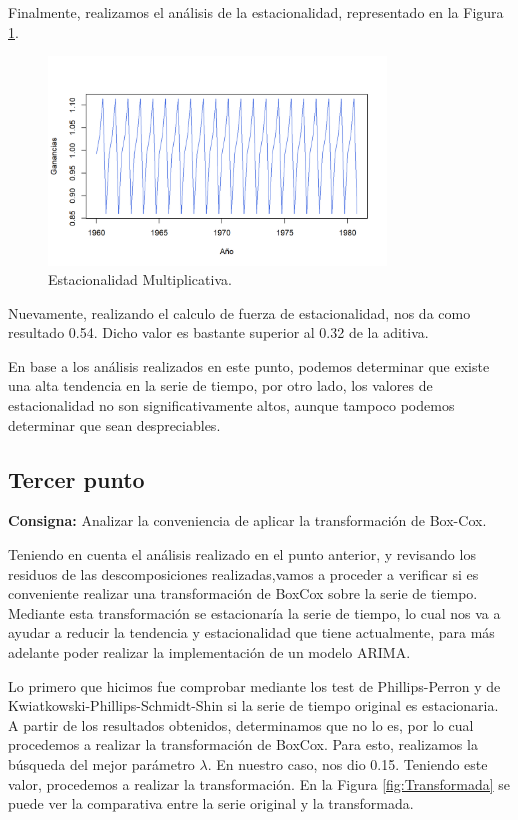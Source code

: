 \documentclass{article} %
\begin{document}
Finalmente, realizamos el análisis de la estacionalidad, representado en la Figura \ref{fig:EstacionalidadMultiplicativa}.

\begin{figure}[H]
	\centering
	\includegraphics[width=0.8\textwidth]{images/4-5 Estacionalidad Multiplicativa}
	\caption{Estacionalidad Multiplicativa.}
	\label{fig:EstacionalidadMultiplicativa}
\end{figure} 

Nuevamente, realizando el calculo de fuerza de estacionalidad, nos da como resultado 0.54. Dicho valor es bastante superior al 0.32 de la aditiva. 

En base a los análisis realizados en este punto, podemos determinar que existe una alta tendencia en la serie de tiempo, por otro lado, los valores de estacionalidad no son significativamente altos, aunque tampoco podemos determinar que sean despreciables.

\subsection{Tercer punto}

\textbf{Consigna:} Analizar la conveniencia de aplicar la transformación de Box-Cox.

Teniendo en cuenta el análisis realizado en el punto anterior, y revisando los residuos de las descomposiciones realizadas,vamos a proceder a verificar si es conveniente realizar una transformación de BoxCox sobre la serie de tiempo. Mediante esta transformación se estacionaría la serie de tiempo, lo cual nos va a ayudar a reducir la tendencia y estacionalidad que tiene actualmente, para más adelante poder realizar la implementación de un modelo ARIMA. 

Lo primero que hicimos fue comprobar mediante los test de Phillips-Perron y de Kwiatkowski-Phillips-Schmidt-Shin si la serie de tiempo original es estacionaria. A partir de los resultados obtenidos, determinamos que no lo es, por lo cual procedemos a realizar la transformación de BoxCox. Para esto, realizamos la búsqueda del mejor parámetro $\lambda$. En nuestro caso, nos dio 0.15. Teniendo este valor, procedemos a realizar la transformación. En la Figura \ref{fig:Transformada} se puede ver la comparativa entre la serie original y la transformada.
\end{document}
